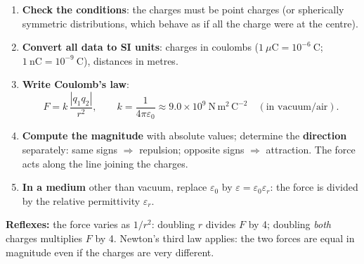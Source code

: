 \documentclass[11pt]{article}
\begin{document}
\begin{methode}
\begin{enumerate}
\item \textbf{Check the conditions}: the charges must be point charges (or spherically symmetric distributions, which behave as if all the charge were at the centre).
\item \textbf{Convert all data to SI units}: charges in coulombs ($1\ \mu\mathrm{C} = 10^{-6}\ \mathrm{C}$; $1\ \mathrm{nC} = 10^{-9}\ \mathrm{C}$), distances in metres.
\item \textbf{Write Coulomb's law}:
\[ F = k\,\frac{|q_1 q_2|}{r^2}, \qquad k = \frac{1}{4\pi\varepsilon_0} \approx 9.0\times 10^{9}\ \mathrm{N\,m^2\,C^{-2}} \quad (\text{in vacuum/air}). \]
\item \textbf{Compute the magnitude} with absolute values; determine the \textbf{direction} separately: same signs $\Rightarrow$ repulsion; opposite signs $\Rightarrow$ attraction. The force acts along the line joining the charges.
\item \textbf{In a medium} other than vacuum, replace $\varepsilon_0$ by $\varepsilon = \varepsilon_0 \varepsilon_r$: the force is divided by the relative permittivity $\varepsilon_r$.
\end{enumerate}
\textbf{Reflexes:} the force varies as $1/r^2$: doubling $r$ divides $F$ by 4; doubling \emph{both} charges multiplies $F$ by 4. Newton's third law applies: the two forces are equal in magnitude even if the charges are very different.
\end{methode}
\end{document}
